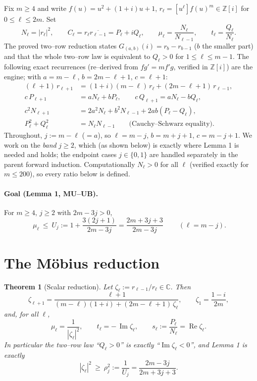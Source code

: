 \documentclass[11pt]{article}
\newtheorem{theorem}{Theorem}
\theoremstyle{definition}
\newcommand{\Z}{\mathbb{Z}}
\newcommand{\C}{\mathbb{C}}
\newcommand{\Re}{\operatorname{Re}}
\newcommand{\Im}{\operatorname{Im}}
\begin{document}
Fix $m\ge 4$ and write $f(u)=u^2+(1+i)u+1$, $r_\ell=[u^\ell]f(u)^m\in\Z[i]$ for
$0\le\ell\le 2m$. Set
\[
N_\ell=|r_\ell|^2,\qquad C_\ell=r_\ell\overline{r_{\ell-1}}=P_\ell+iQ_\ell,
\qquad \mu_\ell=\frac{N_\ell}{N_{\ell-1}},\qquad t_\ell=\frac{Q_\ell}{N_\ell}.
\]
The proved two--row reduction states $G_{(a,b)}(i)=r_b-r_{b-1}$ ($b$ the smaller
part) and that the whole two--row law is equivalent to $Q_\ell>0$ for
$1\le\ell\le m-1$. The following exact recurrences (re--derived from
$f g'=mf'g$, verified in $\Z[i]$) are the engine; with $a=m-\ell$,
$b=2m-\ell+1$, $c=\ell+1$:
\begin{align}
(\ell+1)\,r_{\ell+1}&=(1+i)(m-\ell)\,r_\ell+(2m-\ell+1)\,r_{\ell-1},
\label{eq:rrec}\\
c\,P_{\ell+1}&=a N_\ell+b P_\ell,\qquad
c\,Q_{\ell+1}=a N_\ell-b Q_\ell,\\
c^2 N_{\ell+1}&=2a^2N_\ell+b^2N_{\ell-1}+2ab(P_\ell-Q_\ell),\\
P_\ell^2+Q_\ell^2&=N_\ell N_{\ell-1}\qquad\text{(Cauchy--Schwarz equality).}
\label{eq:CS}
\end{align}
Throughout, $j:=m-\ell$ ($=a$), so $\ell=m-j$, $b=m+j+1$, $c=m-j+1$. We work on
the \emph{band} $j\ge 2$, which (as shown below) is exactly where Lemma 1 is
needed and holds; the endpoint cases $j\in\{0,1\}$ are handled separately in
the parent forward induction. Computationally $N_\ell>0$ for all $\ell$
(verified exactly for $m\le 200$), so every ratio below is defined.

\paragraph{Goal (Lemma 1, MU--UB).} For $m\ge 4$, $j\ge 2$ with $2m-3j>0$,
\[
\boxed{\ \mu_\ell\ \le\ U_j:=1+\frac{3(2j+1)}{2m-3j}=\frac{2m+3j+3}{2m-3j}\ }
\qquad(\ell=m-j).
\]

\section{The M\"obius reduction}

\begin{theorem}[Scalar reduction]\label{thm:mobius}
Let $\zeta_\ell:=r_{\ell-1}/r_\ell\in\C$. Then
\[
\zeta_{\ell+1}=\frac{\ell+1}{(m-\ell)(1+i)+(2m-\ell+1)\,\zeta_\ell},
\qquad \zeta_1=\frac{1-i}{2m},
\]
and, for all $\ell$,
\[
\mu_\ell=\frac{1}{|\zeta_\ell|^2},\qquad
t_\ell=-\,\Im\zeta_\ell,\qquad
s_\ell:=\frac{P_\ell}{N_\ell}=\Re\zeta_\ell .
\]
In particular the two--row law ``$Q_\ell>0$'' is exactly ``$\Im\zeta_\ell<0$'',
and Lemma 1 is exactly
\[
|\zeta_\ell|^2\ \ge\ \rho_j^2:=\frac{1}{U_j}=\frac{2m-3j}{2m+3j+3}.
\]
\end{theorem}
\end{document}
